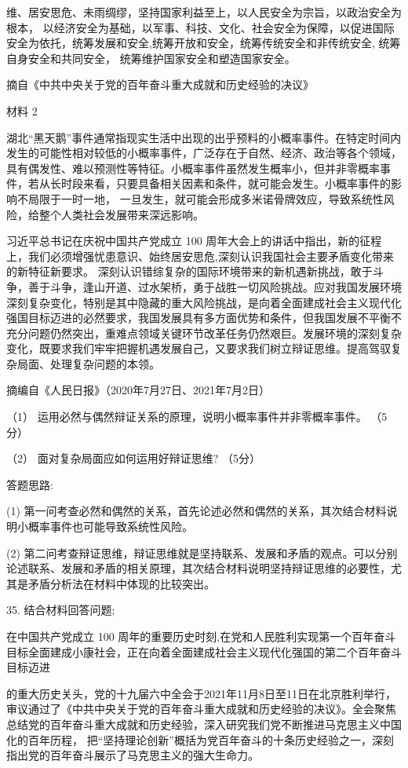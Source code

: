 \documentclass[UTF8,11pt]{ctexart}
\begin{document}
维、居安思危、未雨绸缪，坚持国家利益至上，以人民安全为宗旨，以政治安全为根本， 以经济安全为基础，以军事、科技、文化、社会安全为保障，以促进国际安全为依托，统筹发展和安全,统筹开放和安全，统筹传统安全和非传统安全, 统筹自身安全和共同安全， 统筹维护国家安全和塑造国家安全。

摘自《中共中央关于党的百年奋斗重大成就和历史经验的决议》

材料 2

湖北“黑天鹅”事件通常指现实生活中出现的出乎预料的小概率事件。在特定时间内发生的可能性相对较低的小概率事件，广泛存在于自然、经济、政治等各个领域，具有偶发性、难以预测性等特征。小概率事件虽然发生概率小，但并非零概率事件，若从长时段来看，只要具备相关因素和条件，就可能会发生。小概率事件的影响不局限于一时一地， 一旦发生，就可能会形成多米诺骨牌效应，导致系统性风险，给整个人类社会发展带来深远影响。

习近平总书记在庆祝中国共产党成立 100 周年大会上的讲话中指出，新的征程上，我们必须增强忧患意识、始终居安思危,深刻认识我国社会主要矛盾变化带来的新特征新要求。 深刻认识错综复杂的国际环境带来的新机遇新挑战，敢于斗争，善于斗争，逢山开道、过水架桥，勇于战胜一切风险挑战。应对我国发展环境深刻复杂变化，特别是其中隐藏的重大风险挑战，是向着全面建成社会主义现代化强国目标迈进的必然要求，我国发展具有多方面优势和条件，但我国发展不平衡不充分问题仍然突出，重难点领域关键环节改革任务仍然艰巨。发展环境的深刻复杂变化，既要求我们牢牢把握机遇发展自己，又要求我们树立辩证思维。提高驾驭复杂局面、处理复杂问题的本领。

摘编自《人民日报》（2020年7月27日、2021年7月2日）

（1） 运用必然与偶然辩证关系的原理，说明小概率事件并非零概率事件。 （5分）

（2） 面对复杂局面应如何运用好辩证思维? （5分）

答题思路:

(1) 第一问考查必然和偶然的关系，首先论述必然和偶然的关系，其次结合材料说明小概率事件也可能导致系统性风险。

(2) 第二问考查辩证思维，辩证思维就是坚持联系、发展和矛盾的观点。可以分别论述联系、发展和矛盾的相关原理，其次结合材料说明坚持辩证思维的必要性，尤其是矛盾分析法在材料中体现的比较突出。

35. 结合材料回答问题;

在中国共产党成立 100 周年的重要历史时刻,在党和人民胜利实现第一个百年奋斗目标全面建成小康社会，正在向着全面建成社会主义现代化强国的第二个百年奋斗目标迈进

的重大历史关头，党的十九届六中全会于2021年11月8日至11日在北京胜利举行，审议通过了《中共中央关于党的百年奋斗重大成就和历史经验的决议》。全会聚焦总结党的百年奋斗重大成就和历史经验，深入研究我们党不断推进马克思主义中国化的百年历程， 把“坚持理论创新”概括为党百年奋斗的十条历史经验之一，深刻指出党的百年奋斗展示了马克思主义的强大生命力。
\end{document}
